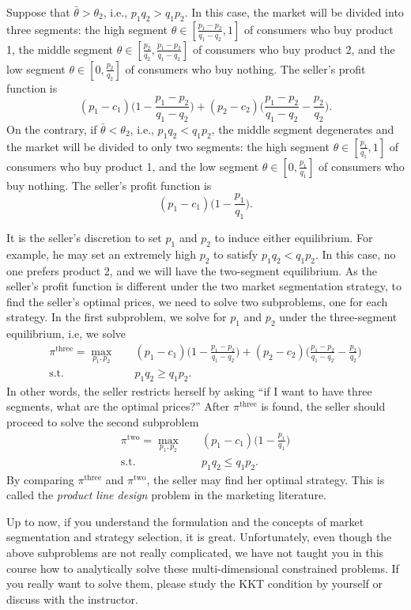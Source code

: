 \documentclass[12pt,a4paper]{article}
\begin{document}
Suppose that $\bar{\theta} > \theta_2$, i.e., $p_1q_2 > q_1p_2$. 
In this case, the market will be divided into three segments: 
the high segment $\theta \in [\frac{p_1 - p_2}{q_1 - q_2}, 1]$ of consumers
who buy product 1, 
the middle segment $\theta \in [\frac{p_2}{q_2}, \frac{p_1 - p_2}{q_1 - q_2}]$
of consumers who buy product 2, and 
the low segment $\theta \in [0, \frac{p_2}{q_2}]$ of consumers who buy nothing. 
The seller's profit function is 
\[
	(p_1 - c_1)\bigg(1 - \frac{p_1 - p_2}{q_1 - q_2}\bigg)
	+ (p_2 - c_2)\bigg(\frac{p_1 - p_2}{q_1 - q_2} - \frac{p_2}{q_2}\bigg).
\]
On the contrary, if $\bar{\theta} < \theta_2$, i.e., $p_1q_2 < q_1p_2$,  
the middle segment degenerates and the market will be divided to only two segments: 
the high segment $\theta \in [\frac{p_1}{q_1}, 1]$ of consumers
who buy product 1, and 
the low segment $\theta \in [0, \frac{p_1}{q_1}]$ of consumers who buy nothing. 
The seller's profit function is 
\[
	(p_1 - c_1)\bigg(1 - \frac{p_1}{q_1}\bigg). 
\]

It is the seller's discretion to set $p_1$ and $p_2$ to induce either equilibrium. 
For example, he may set an extremely high $p_2$ to satisfy $p_1 q_2 < q_1 p_2$. 
In this case, no one prefers product 2, and we will have the two-segment equilibrium. 
As the seller's profit function is different under the two market segmentation
strategy, to find the seller's optimal prices, we need to solve two subproblems, 
one for each strategy. In the first subproblem, we solve for $p_1$ and $p_2$ 
under the three-segment equilibrium, i.e, we solve 
\[\begin{split}
	\pi^{\mathrm{three}} = \max_{p_1, p_2} \quad & 
		(p_1 - c_1)\bigg(1 - \frac{p_1 - p_2}{q_1 - q_2}\bigg)
		+ (p_2 - c_2)\bigg(\frac{p_1 - p_2}{q_1 - q_2} - \frac{p_2}{q_2}\bigg) \\
	\mbox{s.t.} \quad & p_1q_2 \geq q_1p_2. 
\end{split}\]
In other words, the seller restricts herself by asking ``if I want to have 
three segments, what are the optimal prices?'' After $\pi^{\mathrm{three}}$ is found, 
the seller should proceed to solve the second subproblem
\[\begin{split}
	\pi^{\mathrm{two}} = \max_{p_1, p_2} \quad & 
		(p_1 - c_1)\bigg(1 - \frac{p_1}{q_1}\bigg) \\
	\mbox{s.t.} \quad & p_1q_2 \leq q_1p_2. 
\end{split}\]
By comparing $\pi^{\mathrm{three}}$ and $\pi^{\mathrm{two}}$, the seller may 
find her optimal strategy. This is called the \textit{product line design} 
problem in the marketing literature. 

Up to now, if you understand the formulation and the concepts of market segmentation
and strategy selection, it is great. Unfortunately, even though the above 
subproblems are not really complicated, we have not taught you in this course 
how to analytically solve these multi-dimensional constrained problems. 
If you really want to solve them, please study the KKT condition by yourself 
or discuss with the instructor. 
\end{document}
